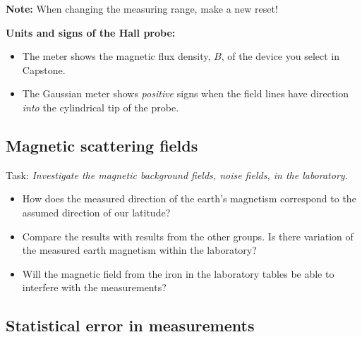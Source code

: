 \documentclass[../Elmag-labhefte-2020.tex]{subfiles}
\begin{document}
\textbf{Note:} When changing the measuring range, make a new reset!

\textbf{Units and signs of the Hall probe:}
\vspace{-4mm}
\begin{itemize}
    \item The meter shows the magnetic flux density, $B$, of the device you select in Capstone.
    \item The Gaussian meter shows \emph{positive} signs when the field lines have direction \emph{into} the cylindrical tip of the probe.
\end{itemize}

\subsection{Magnetic scattering fields}

Task:
\emph{Investigate the magnetic background fields, noise fields, in the laboratory.}
\begin{itemize}
\item How does the measured direction of the earth's magnetism correspond to the assumed direction of our latitude?
    \item Compare the results with results from the other groups. Is there variation of the measured earth magnetism within the laboratory?
    \item Will the magnetic field from the iron in the laboratory tables be able to interfere with the measurements?
\end{itemize}



\subsection{Statistical error in measurements}
\end{document}
